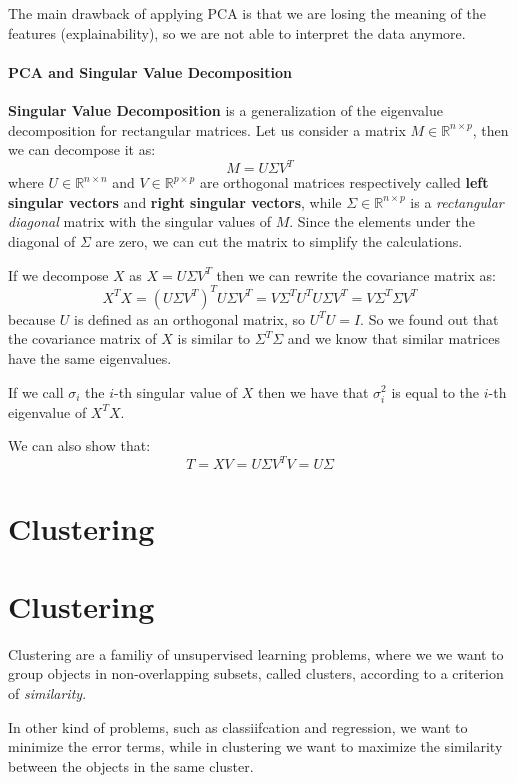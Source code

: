 The main drawback of applying PCA is that we are losing the meaning of the features (explainability), so we are not able to interpret the data anymore.

\paragraph*{PCA and Singular Value Decomposition}
\textbf{Singular Value Decomposition} is a generalization of the eigenvalue decomposition for rectangular matrices. Let us consider a matrix $M \in \mathbb{R}^{n \times p}$, then we can decompose it as:
\[
    M = U \Sigma V^T
\]
where $U \in \mathbb{R}^{n \times n}$ and $V \in \mathbb{R}^{p \times p}$ are orthogonal matrices respectively called \textbf{left singular vectors} and \textbf{right singular vectors}, while $\Sigma \in \mathbb{R}^{n \times p}$ is a \textit{rectangular diagonal} matrix with the singular values of $M$. Since the elements under the diagonal of $\Sigma$ are zero, we can cut the matrix to simplify the calculations.

If we decompose $X$ as $X = U \Sigma V^T$ then we can rewrite the covariance matrix as:
\[
    X^T X = (U \Sigma V^T)^T U \Sigma V^T = V \Sigma^T U^T U \Sigma V^T = V \Sigma^T \Sigma V^T
\]
because $U$ is defined as an orthogonal matrix, so $U^T U = I$.
So we found out that the covariance matrix of $X$ is similar to $\Sigma^T \Sigma$ and we know that similar matrices have the same eigenvalues.

If we call $\sigma_i$ the $i$-th singular value of $X$ then we have that $\sigma_i^2$ is equal to the $i$-th eigenvalue of $X^T X$.

We can also show that:
\[
    T = X V = U \Sigma V^T V = U \Sigma
\]

\section{Clustering}
\section*{Clustering}
Clustering are a familiy of unsupervised learning problems, where we we want to group objects in non-overlapping subsets, called clusters, according to a criterion of \textit{similarity}.

In other kind of problems, such as classiifcation and regression, we want to minimize the error terms, while in clustering we want to maximize the similarity between the objects in the same cluster.

